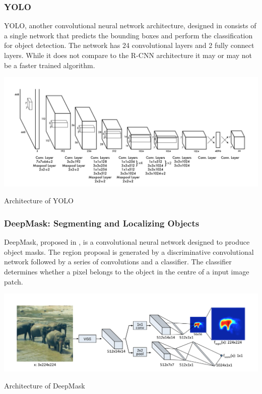 \subsubsection{YOLO}
YOLO, another convolutional neural network architecture, designed in \cite{DBLP:journals/corr/RedmonDGF15} consists of a single network that predicts the bounding boxes and perform the classification for object detection. 
The network has 24 convolutional layers and 2 fully connect layers.  
While it does not compare to the R-CNN architecture it may or may not be a faster trained algorithm.

\begin{table}[!ht]
  \includegraphics[width=\textwidth]{figs/yolo.png}
  \caption{Architecture of YOLO}
  \label{fig:yolo}
\end{table}


\subsubsection{DeepMask: Segmenting and Localizing Objects}
DeepMask, proposed in \cite{DBLP:journals/corr/PinheiroCD15}, is a convolutional neural network designed to produce object masks.
The region proposal is generated by a discriminative convolutional network followed by a series of convolutions and a classifier.
The classifier determines whether a pixel belongs to the object in the centre of a input image patch.

\begin{table}[!ht]
  \includegraphics[width=\textwidth]{figs/deepmsk.png}
  \caption{Architecture of DeepMask}
  \label{fig:deepmsk}
\end{table}


